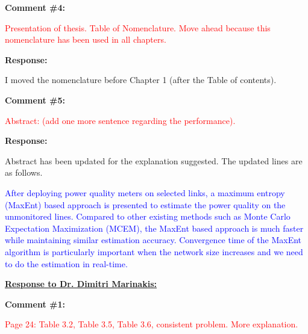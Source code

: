 \documentclass[journal]{IEEEtran}
\begin{document}
\vspace{30pt}
\textbf{Comment \#4:}
\begin{adjustwidth}{2.5em}{0pt}
\singlespacing \vspace{-10pt}
\textcolor{red}{Presentation of thesis. Table of Nomenclature. Move ahead because this nomenclature has been used in all chapters.}
\end{adjustwidth}

\vspace{10pt}
\textbf{Response:}
\begin{adjustwidth}{2.5em}{0pt}
I moved the nomenclature before Chapter 1 (after the Table of contents).
\end{adjustwidth}

\vspace{30pt}
\textbf{Comment \#5:}
\begin{adjustwidth}{2.5em}{0pt}
\singlespacing \vspace{-10pt}
\textcolor{red}{Abstract: (add one more sentence regarding the performance).}
\end{adjustwidth}

\vspace{10pt}
\textbf{Response:}
\begin{adjustwidth}{2.5em}{0pt}
Abstract has been updated for the explanation suggested. The updated lines are as follows.

\vspace{10pt}
\noindent\textcolor{blue}{After deploying power quality meters on selected links, a maximum entropy (MaxEnt) based approach is presented to estimate the power quality on the unmonitored lines. Compared to other existing methods such as Monte Carlo Expectation Maximization (MCEM), the MaxEnt based approach is much faster while maintaining similar estimation accuracy. Convergence time of the MaxEnt algorithm is particularly important when the network size increases and we need to do the estimation in real-time.}
\end{adjustwidth}





\vspace{50pt} 
  \Large
\noindent \textbf{\underline{Response to Dr. Dimitri Marinakis:}}
 \large
 
\vspace{10pt}
\textbf{Comment \#1:}
\begin{adjustwidth}{2.5em}{0pt}
\singlespacing \vspace{-10pt}
\textcolor{red}{Page 24: Table 3.2, Table 3.5, Table 3.6, consistent problem. More explanation.}
\end{adjustwidth}
\end{document}
